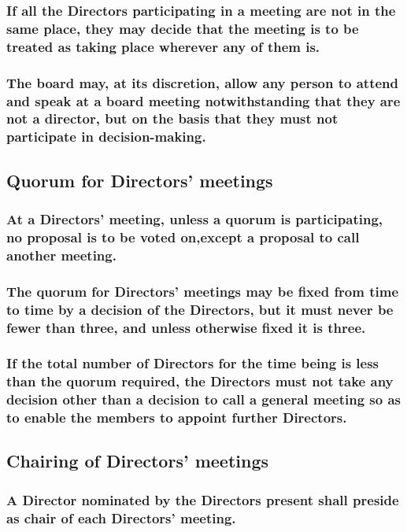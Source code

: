 \documentclass[12pt]{article}
\begin{document}
\subsubsection{If all the Directors participating in a meeting are not in the same place, they may decide that the meeting is to be treated as taking place wherever any of them is.}
\subsubsection{The board may, at its discretion, allow any person to attend and speak at a board meeting notwithstanding that they are not a director, but on the basis that they must not participate in decision-making.}

\subsection{Quorum for Directors' meetings}
\subsubsection{At a Directors' meeting, unless a quorum is participating, no proposal is to be voted on,except a proposal to call another meeting.}
\subsubsection{The quorum for Directors' meetings may be fixed from time to time by a decision of the Directors, but it must never be fewer than three, and unless otherwise fixed it is three.}
\subsubsection{If the total number of Directors for the time being is less than the quorum required, the Directors must not take any decision other than a decision to call a general meeting so as to enable the members to appoint further Directors.}

\subsection{Chairing of Directors' meetings}
\subsubsection{A Director nominated by the Directors present shall preside as chair of each Directors' meeting.}

\end{document}
